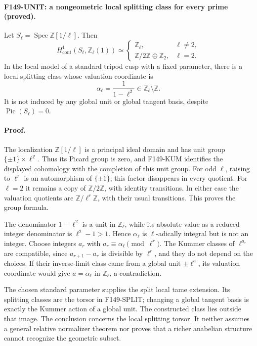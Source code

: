 \documentclass[11pt,a4paper]{article}
\theoremstyle{definition}
\begin{document}
\paragraph{F149-UNIT: a nongeometric local splitting class for every prime
(proved).}
Let \(S_\ell=\operatorname{Spec}\mathbb Z[1/\ell]\).  Then
\[
 H^1_{\mathrm{cont}}(S_\ell,\mathbb Z_\ell(1))
 \simeq
 \begin{cases}
 \mathbb Z_\ell,&\ell\ne2,\\
 \mathbb Z/2\mathbb Z\oplus\mathbb Z_2,&\ell=2.
 \end{cases}
\]
In the local model of a standard tripod cusp with a fixed parameter,
there is a local splitting class whose valuation coordinate is
\[
 \alpha_\ell=\frac{1}{1-\ell^2}\in\mathbb Z_\ell\setminus\mathbb Z.
 \tag{F149-UNIT}
\]
It is not induced by any global unit or global tangent basis, despite
\(\operatorname{Pic}(S_\ell)=0\).

\paragraph{Proof.}
The localization \(\mathbb Z[1/\ell]\) is a principal ideal domain and
has unit group \(\{\pm1\}\times\ell^{\mathbb Z}\).  Thus its Picard group
is zero, and F149-KUM identifies the displayed cohomology with the
completion of this unit group.  For odd \(\ell\), raising to
\(\ell^r\) is an automorphism of \(\{\pm1\}\); this factor disappears
in every quotient.  For \(\ell=2\) it remains a copy of
\(\mathbb Z/2\mathbb Z\), with identity transitions.  In either case
the valuation quotients are \(\mathbb Z/\ell^r\mathbb Z\), with their
usual transitions.  This proves the group formula.

The denominator \(1-\ell^2\) is a unit in \(\mathbb Z_\ell\), while
its absolute value as a reduced integer denominator is
\(\ell^2-1>1\).  Hence \(\alpha_\ell\) is \(\ell\)-adically integral
but is not an integer.  Choose integers \(a_r\) with
\(a_r\equiv\alpha_\ell\pmod{\ell^r}\).  The Kummer classes of
\(\ell^{a_r}\) are compatible, since
\(a_{r+1}-a_r\) is divisible by \(\ell^r\), and they do not depend
on the choices.  If their inverse-limit class came from a global
unit \(\pm\ell^a\), its valuation coordinate would give
\(a=\alpha_\ell\) in \(\mathbb Z_\ell\), a contradiction.

The chosen standard parameter supplies the split local tame extension.
Its splitting classes are the torsor in F149-SPLIT; changing a global
tangent basis is exactly the Kummer action of a global unit.  The
constructed class lies outside that image.  The conclusion concerns
the local splitting torsor.  It neither assumes a general relative
normalizer theorem nor proves that a richer anabelian structure cannot
recognize the geometric subset.
\end{document}
